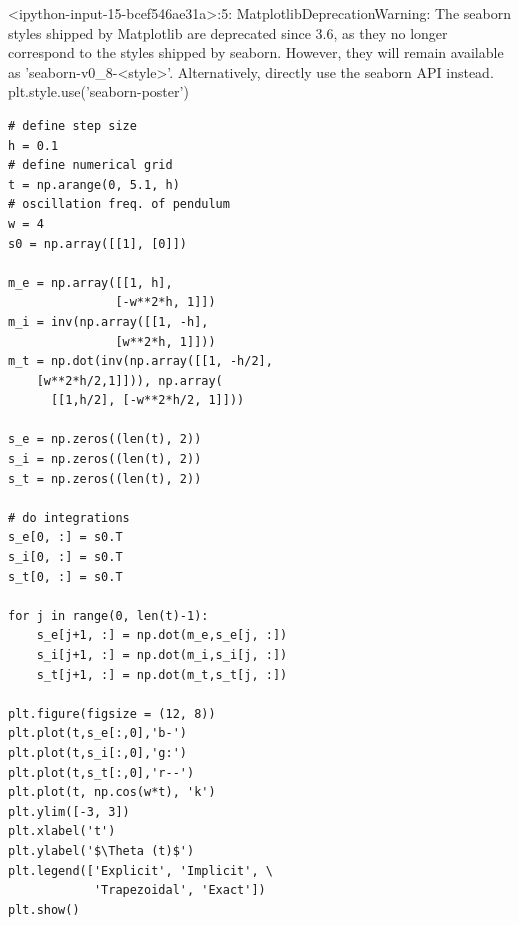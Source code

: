 \documentclass[11pt]{article}
\begin{document}
<ipython-input-15-bcef546ae31a>:5: MatplotlibDeprecationWarning: The seaborn styles shipped by Matplotlib are deprecated since 3.6, as they no longer correspond to the styles shipped by seaborn. However, they will remain available as 'seaborn-v0\_8-<style>'. Alternatively, directly use the seaborn API instead.
  plt.style.use('seaborn-poster')

\begin{verbatim}
# define step size
h = 0.1
# define numerical grid
t = np.arange(0, 5.1, h)
# oscillation freq. of pendulum
w = 4
s0 = np.array([[1], [0]])

m_e = np.array([[1, h], 
               [-w**2*h, 1]])
m_i = inv(np.array([[1, -h], 
               [w**2*h, 1]]))
m_t = np.dot(inv(np.array([[1, -h/2], 
    [w**2*h/2,1]])), np.array(
      [[1,h/2], [-w**2*h/2, 1]]))

s_e = np.zeros((len(t), 2))
s_i = np.zeros((len(t), 2))
s_t = np.zeros((len(t), 2))

# do integrations
s_e[0, :] = s0.T
s_i[0, :] = s0.T
s_t[0, :] = s0.T

for j in range(0, len(t)-1):
    s_e[j+1, :] = np.dot(m_e,s_e[j, :])
    s_i[j+1, :] = np.dot(m_i,s_i[j, :])
    s_t[j+1, :] = np.dot(m_t,s_t[j, :])
    
plt.figure(figsize = (12, 8))
plt.plot(t,s_e[:,0],'b-')
plt.plot(t,s_i[:,0],'g:')
plt.plot(t,s_t[:,0],'r--')
plt.plot(t, np.cos(w*t), 'k')
plt.ylim([-3, 3])
plt.xlabel('t')
plt.ylabel('$\Theta (t)$')
plt.legend(['Explicit', 'Implicit', \
            'Trapezoidal', 'Exact'])
plt.show()
\end{verbatim}
\end{document}
